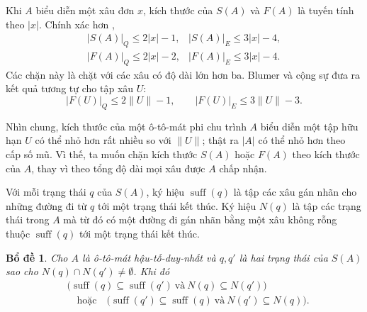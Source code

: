 \documentclass[11pt]{article}
\newtheorem{lemma}{Bổ đề}
\newcommand{\suff}{\operatorname{suff}}
\begin{document}
Khi $A$ biểu diễn một xâu đơn $x$, kích thước của $S(A)$ và $F(A)$ là tuyến
tính theo $|x|$. Chính xác hơn \cite{crochemore-transducers,blumer-smallest},
\[
\begin{array}{ll}
  |S(A)|_Q \le 2|x|-1, & |S(A)|_E \le 3|x|-4,\\
  |F(A)|_Q \le 2|x|-2, & |F(A)|_E \le 3|x|-4.
\end{array}
\tag{1}
\]
Các chặn này là chặt với các xâu có độ dài lớn hơn ba. Blumer và cộng sự
\cite{blumer-complete} đưa ra kết quả tương tự cho tập xâu $U$:
\[
  |F(U)|_Q \le 2\|U\|-1,\qquad |F(U)|_E \le 3\|U\|-3.
\tag{2}
\]

Nhìn chung, kích thước của một ô-tô-mát phi chu trình $A$ biểu diễn một tập
hữu hạn $U$ có thể nhỏ hơn rất nhiều so với $\|U\|$; thật ra $|A|$ có thể nhỏ
hơn theo cấp số mũ. Vì thế, ta muốn chặn kích thước $S(A)$ hoặc $F(A)$ theo
kích thước của $A$, thay vì theo tổng độ dài mọi xâu được $A$ chấp nhận.

Với mỗi trạng thái $q$ của $S(A)$, ký hiệu $\suff(q)$ là tập các xâu gán nhãn
cho những đường đi từ $q$ tới một trạng thái kết thúc. Ký hiệu $N(q)$ là tập
các trạng thái trong $A$ mà từ đó có một đường đi gán nhãn bằng một xâu không
rỗng thuộc $\suff(q)$ tới một trạng thái kết thúc.

\begin{lemma}
Cho $A$ là ô-tô-mát hậu-tố-duy-nhất và $q,q'$ là hai trạng thái của $S(A)$ sao
cho $N(q)\cap N(q')\ne\emptyset$. Khi đó
\[
\begin{aligned}
  &\bigl(\suff(q)\subseteq\suff(q')\ \text{và}\ N(q)\subseteq N(q')\bigr)\\
  &\quad\text{hoặc}\quad
  \bigl(\suff(q')\subseteq\suff(q)\ \text{và}\ N(q')\subseteq N(q)\bigr).
\end{aligned}
\tag{3}
\]
\end{lemma}
\end{document}
